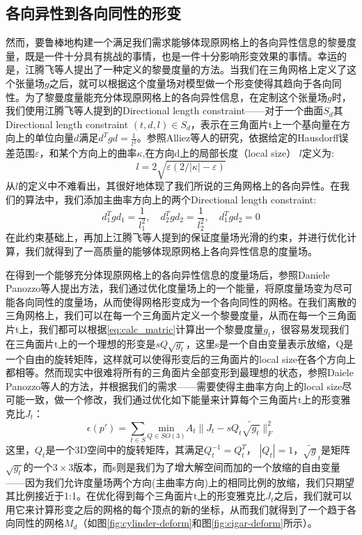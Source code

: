 \subsection{各向异性到各向同性的形变}
然而，要鲁棒地构建一个满足我们需求能够体现原网格上的各向异性信息的黎曼度量，既是一件十分具有挑战的事情，也是一件十分影响形变效果的事情。幸运的是，江腾飞等人提出了一种定义的黎曼度量的方法\cite{frame-field-gen}。当我们在三角网格上定义了这个张量场$g$之后，就可以根据这个度量场对模型做一个形变使得其趋向于各向同性。为了黎曼度量能充分体现原网格上的各向异性信息，在定制这个张量场$g$时，我们使用江腾飞等人提到的Directional length constraint\cite{frame-field-gen}——对于一个曲面$S_d$其Directional length constraint $(t, d, l) \in S_d$，表示在三角面片t上一个基向量在方向上的单位向量$d$满足$d^T g d = \frac{1}{l^2}$。参照Alliez等人的研究\cite{remesh-length}，依据给定的Hausdorff误差范围$\varepsilon$，和某个方向上的曲率$\kappa$,在方向d上的局部长度（local size） $l$定义为:
\begin{equation}
  l = 2 \sqrt{\varepsilon(2/|\kappa| - \varepsilon)}
\end{equation}
从$l$的定义中不难看出，其很好地体现了我们所说的三角网格上的各向异性。在我们的算法中，我们添加主曲率方向上的两个Directional length constraint:
\begin{equation}
  d_1^T g d_1 = \frac{1}{l_1^2}, \quad  d_2^T g d_2 = \frac{1}{l_2^2}, \quad d_1^T g d_2 = 0
  \label{eq:calc_matric}
\end{equation}
在此约束基础上，再加上江腾飞等人提到的保证度量场光滑的约束，并进行优化计算，我们就得到了一高质量的能够体现原网格上各向异性信息的度量场。\par
在得到一个能够充分体现原网格上的各向异性信息的度量场后，参照Daniele Panozzo等人提出方法\cite{frame-field-warping}，我们通过优化度量场上的一个能量，将原度量场变为尽可能各向同性的度量场，从而使得网格形变成为一个各向同性的网格。在我们离散的三角网格上，我们可以在每一个三角面片定义一个黎曼度量，从而在每一个三角面片t上，我们都可以根据\eqref{eq:calc_matric}计算出一个黎曼度量$g_t$，很容易发现我们在三角面片t上的一个理想的形变是$sQ\sqrt{g_t}$，这里s是一个自由变量表示放缩，Q是一个自由的旋转矩阵，这样就可以使得形变后的三角面片的local size在各个方向上都相等。然而现实中很难将所有的三角面片全部变形到最理想的状态，参照Daiele Panozzo等人的方法\cite{frame-field-warping}，并根据我们的需求——需要使得主曲率方向上的local size尽可能一致，做一个修改，我们通过优化如下能量来计算每个三角面片t上的形变雅克比$J_t$：
\begin{equation}
  \epsilon(p') = \sum_{t\in S} \underset{Q \in SO(3)}{\text{min}} A_t \lVert J_t - sQ_t \widetilde{\sqrt{g_t}} \rVert_F^2
\end{equation}
这里，$Q_t$是一个3D空间中的旋转矩阵，其满足$Q_t^{-1} = Q_t^T$， $|Q_t| = 1$，$\widetilde{\sqrt{g}}_t$是矩阵$\sqrt{g_t}$的一个$3 \times 3$版本，而s则是我们为了增大解空间而加的一个放缩的自由变量——因为我们允许度量场两个方向(主曲率方向)上的相同比例的放缩，我们只期望其比例接近于1:1。在优化得到每个三角面片t上的形变雅克比$J_t$之后，我们就可以用它来计算形变之后的网格的每个顶点的新的坐标，从而我们就得到了一个趋于各向同性的网格$M_d$（如图\ref{fig:cylinder-deform}和图\ref{fig:cigar-deform}所示）。

